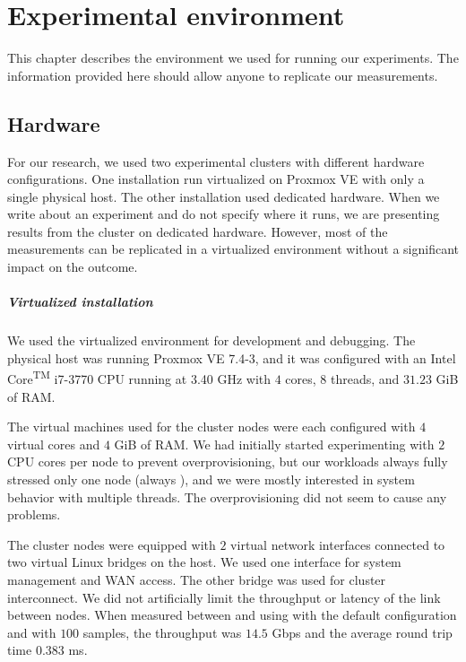 \chapter{Experimental environment}
\label{chap:env}

This chapter describes the environment we used for running our experiments. The information provided here should allow anyone to replicate our measurements.

\section{Hardware}
\label{sec:hw-env}

For our research, we used two experimental clusters with different hardware configurations. One installation run virtualized on Proxmox VE with only a single physical host. The other installation used dedicated hardware. When we write about an experiment and do not specify where it runs, we are presenting results from the cluster on dedicated hardware. However, most of the measurements can be replicated in a virtualized environment without a significant impact on the outcome.

\paragraph{Virtualized installation}
We used the virtualized environment for development and debugging. The physical host was running Proxmox VE 7.4-3, and it was configured with an Intel\textsuperscript{\textregistered} Core\textsuperscript{TM} i7-3770 CPU running at 3.40 GHz with $4$ cores, $8$ threads, and $31.23$ GiB of RAM.

The virtual machines used for the cluster nodes were each configured with $4$ virtual cores and $4$ GiB of RAM. We had initially started experimenting with $2$ CPU cores per node to prevent overprovisioning, but our workloads always fully stressed only one node (always ), and we were mostly interested in system behavior with multiple threads. The overprovisioning did not seem to cause any problems.

The cluster nodes were equipped with $2$ virtual network interfaces connected to two virtual Linux bridges on the host. We used one interface for system management and WAN access. The other bridge was used for cluster interconnect. We did not artificially limit the throughput or latency of the link between nodes. When measured between  and  using  with the default configuration and  with $100$ samples, the throughput was $14.5$ Gbps and the average round trip time $0.383$ ms.

